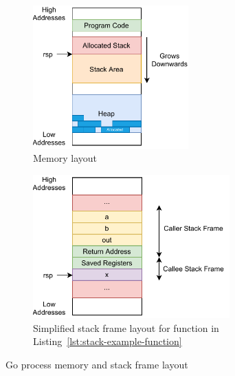 \begin{figure}[htp!]
    \centering

    \begin{subfigure}[t]{0.45\textwidth}
        \centering
        \includegraphics[height=5.5cm]{assets/figures/chapter2/memory-layout.pdf}
        \caption{Memory layout}
        \label{subfig:memory:memory-layout}
    \end{subfigure}
    \begin{subfigure}[t]{0.45\textwidth}
        \centering
        \includegraphics[height=5.5cm]{assets/figures/chapter2/stack-frame.pdf}
        \caption{Simplified stack frame layout for function in Listing~\ref{lst:stack-example-function}}
        \label{subfig:memory:stack-frame}
    \end{subfigure}

    \caption{Go process memory and stack frame layout}
    \label{fig:memory-stack}
\end{figure}
